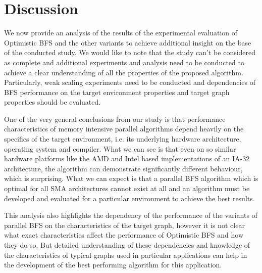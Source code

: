 \documentclass[letterpaper]{article}
\begin{document}
	\section{Discussion}\label{sec:disc} %
		We now provide an analysis of the results of the experimental evaluation of Optimistic BFS and the other variants to achieve additional insight on the base of the conducted study.
		We would like to note that the study can't be considered as complete and additional experiments and analysis need to be conducted to achieve a clear understanding of all the properties of the proposed algorithm.  
		Particularly, weak scaling experiments need to be conducted and dependencies of BFS performance on the target environment properties and target graph properties should be evaluated. 
		
		One of the very general conclusions from our study is that performance characteristics of memory intensive parallel algorithms depend heavily on the specifics of the target environment, i.e. its underlying hardware architecture, operating system and compiler.
		What we can see is that even on so similar hardware platforms like the AMD and Intel based implementations of an IA-32 architecture, the algorithm can demonstrate significantly different behaviour, which is surprising.
		What we can expect is that a parallel BFS algorithm which is optimal for all SMA architectures cannot exist at all and an algorithm must be developed and evaluated for a particular environment to achieve the best results.
		
		This analysis also highlights the dependency of the performance of the variants of parallel BFS on the characteristics of the target graph, however it is not clear what exact characteristics affect the performance of Optimistic BFS and how they do so. 
		But detailed understanding of these dependencies and knowledge of the characteristics of typical graphs used in particular applications can help in the development of the best performing algorithm for this application.
		
\end{document}
